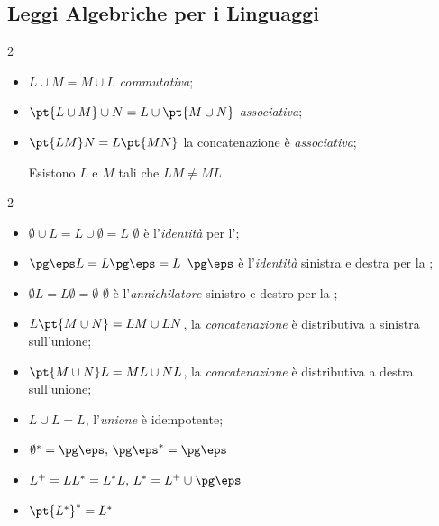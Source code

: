 \subsection{Leggi Algebriche per i Linguaggi}\label{sub:lr_leggi_algebriche_per_i_linguaggi} %
\begin{multicols}{2}
    \begin{itemize}
        \item $L\cup M = M \cup L$ \textit{commutativa};
        \item $\pt{L \cup M} \cup N = L \cup \pt{M \cup N}$ \textit{associativa};
    \end{itemize}
\end{multicols}
\begin{itemize}
    \item $\pt{LM}N = L\pt{MN}$ la concatenazione è \textit{associativa};
        \begin{note}
            Esistono $L$ e $M$ tali che $LM \ne ML$
        \end{note}
\end{itemize}
\begin{multicols}{2}
    \begin{itemize}
        \item $\emptyset \cup L = L \cup \emptyset = L$ $\emptyset$ è l'\textit{identità} per l';
        \item $\pg \eps L = L \pg\eps = L$ $\pg\eps$ è l'\textit{identità} sinistra e destra per la ;
        \item $\emptyset L = L\emptyset = \emptyset$ $\emptyset$ è l'\textit{annichilatore} sinistro e destro per la ;
        \item $L \pt{M \cup N} = LM \cup LN$, la \textit{concatenazione} è distributiva a sinistra sull'unione;
        \item $\pt{M\cup N}L = ML \cup NL$, la \textit{concatenazione} è distributiva a destra sull'unione;
        \item $L\cup L = L$, l'\textit{unione} è idempotente;
        \item $\emptyset^* = \pg \eps,\,\pg\eps^* = \pg\eps$
        \item $L^+ = LL^* = L^*L,\,L^* = L^+ \cup\pg\eps$
        \item $\pt{L^*}^* = L^*$
    \end{itemize}
\end{multicols}
%
